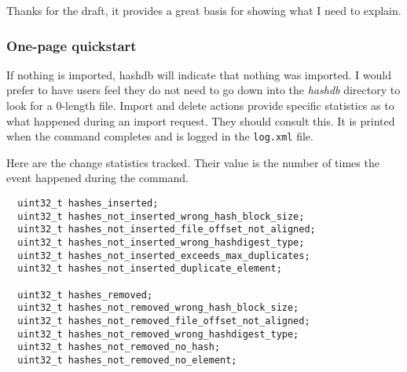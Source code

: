 \documentclass[12pt,twoside]{article}
\newcommand{\hdb}{\emph{hashdb}\xspace}
\begin{document}
Thanks for the draft, it provides a great basis for showing what I need to
explain.

\subsubsection*{One-page quickstart}

If nothing is imported, hashdb will indicate that nothing was imported.
I would prefer to have users feel they do not need to go down
into the \hdb directory to look for a 0-length file.
Import and delete actions provide specific statistics as to what happened
during an import request.
They should consult this.
It is printed when the command completes
and is logged in the \texttt{log.xml} file.

Here are the change statistics tracked.
Their value is the number of times the event happened during the command.

\begin{verbatim}
  uint32_t hashes_inserted;
  uint32_t hashes_not_inserted_wrong_hash_block_size;
  uint32_t hashes_not_inserted_file_offset_not_aligned;
  uint32_t hashes_not_inserted_wrong_hashdigest_type;
  uint32_t hashes_not_inserted_exceeds_max_duplicates;
  uint32_t hashes_not_inserted_duplicate_element;

  uint32_t hashes_removed;
  uint32_t hashes_not_removed_wrong_hash_block_size;
  uint32_t hashes_not_removed_file_offset_not_aligned;
  uint32_t hashes_not_removed_wrong_hashdigest_type;
  uint32_t hashes_not_removed_no_hash;
  uint32_t hashes_not_removed_no_element;
\end{verbatim}
\end{document}
